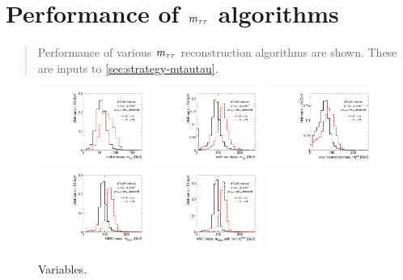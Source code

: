 \chapter[Performance of $\mtautau$ algorithms][Performance of $\mtautau$ algorithms]{Performance of $\mtautau$ algorithms}
\label{apx:mtautau}

\begin{quote}
Performance of various $\mtautau$ reconstruction algorithms are shown. These are inputs to \cref{sec:strategy-mtautau}.
\end{quote}

\begin{figure}[tp]
  \centering
  \includegraphics[width=0.32\textwidth]{figures/mtautau/mtautau-boost-mvis}
  \includegraphics[width=0.32\textwidth]{figures/mtautau/mtautau-boost-mcol}
  \includegraphics[width=0.32\textwidth]{figures/mtautau/mtautau-boost-mttot}
  \includegraphics[width=0.32\textwidth]{figures/mtautau/mtautau-boost-mMMC}
  \includegraphics[width=0.32\textwidth]{figures/mtautau/mtautau-boost-mMMC_Truth}
  \caption{Variables.}
  \label{fig:mtautau-boost}
\end{figure}

